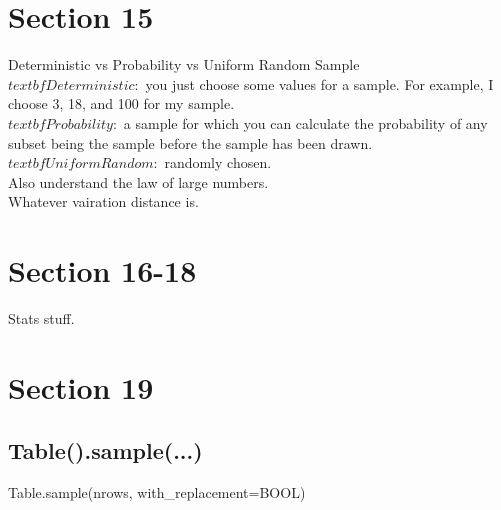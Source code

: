 \documentclass[10pt, a4paper, twocolumn]{article}
\begin{document}
    \section{Section 15}
    Deterministic vs Probability vs Uniform Random Sample\\
    $textbf{Deterministic:}$ you just choose some values for a sample. For example, I choose 3, 18, and 100 for my sample.\\
    $textbf{Probability:}$ a sample for which you can calculate the probability of any subset being the sample before the sample has been drawn.\\
    $textbf{Uniform Random:}$ randomly chosen.\\
    Also understand the law of large numbers.\\
    Whatever vairation distance is.
    \section{Section 16-18}
    Stats stuff.\\

    \section{Section 19}
    \subsection{Table().sample(...)}
    Table.sample(nrows, with\_replacement=BOOL)\\
\end{document}
